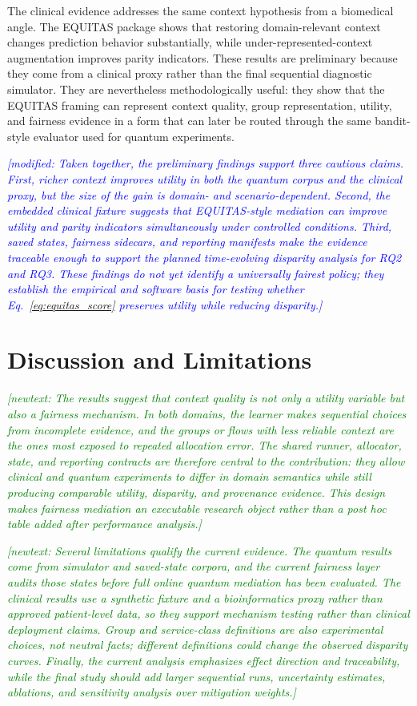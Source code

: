 \documentclass[conference]{IEEEtran}
\newcommand{\modified}[1]{\textcolor{blue}{{\it [modified: #1]}}}
\newcommand{\newtext}[1]{\textcolor{green}{{\it [newtext: #1]}}}
\begin{document}
The clinical evidence addresses the same context hypothesis from a biomedical
angle. The EQUITAS package shows that restoring domain-relevant context changes
prediction behavior substantially, while under-represented-context
augmentation improves parity indicators. These results are preliminary because
they come from a clinical proxy rather than the final sequential diagnostic
simulator. They are nevertheless methodologically useful: they show that the
EQUITAS framing can represent context quality, group representation, utility,
and fairness evidence in a form that can later be routed through the same
bandit-style evaluator used for quantum experiments.

\modified{Taken together, the preliminary findings support three cautious
claims. First, richer context improves utility in both the quantum corpus and
the clinical proxy, but the size of the gain is domain- and scenario-dependent.
Second, the embedded clinical fixture suggests that EQUITAS-style mediation can
improve utility and parity indicators simultaneously under controlled
conditions. Third, saved states, fairness sidecars, and reporting manifests make
the evidence traceable enough to support the planned time-evolving disparity
analysis for RQ2 and RQ3. These findings do not yet identify a universally
fairest policy; they establish the empirical and software basis for testing
whether Eq.~\ref{eq:equitas_score} preserves utility while reducing disparity.}

\section{Discussion and Limitations}
\newtext{The results suggest that context quality is not only a utility
variable but also a fairness mechanism. In both domains, the learner makes
sequential choices from incomplete evidence, and the groups or flows with less
reliable context are the ones most exposed to repeated allocation error. The
shared runner, allocator, state, and reporting contracts are therefore central
to the contribution: they allow clinical and quantum experiments to differ in
domain semantics while still producing comparable utility, disparity, and
provenance evidence. This design makes fairness mediation an executable
research object rather than a post hoc table added after performance analysis.}

\newtext{Several limitations qualify the current evidence. The quantum results
come from simulator and saved-state corpora, and the current fairness layer
audits those states before full online quantum mediation has been evaluated.
The clinical results use a synthetic fixture and a bioinformatics proxy rather
than approved patient-level data, so they support mechanism testing rather
than clinical deployment claims. Group and service-class definitions are also
experimental choices, not neutral facts; different definitions could change the
observed disparity curves. Finally, the current analysis emphasizes effect
direction and traceability, while the final study should add larger sequential
runs, uncertainty estimates, ablations, and sensitivity analysis over
mitigation weights.}
\end{document}
